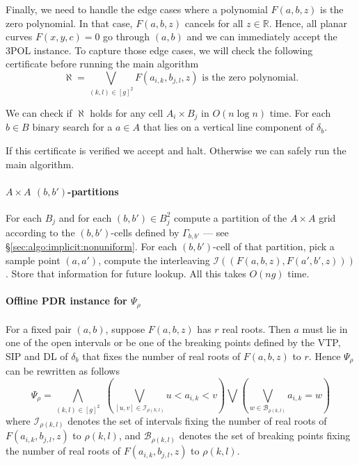Finally, we need to handle the edge cases where a polynomial $F(a,b,z)$ is the
zero polynomial. In that case, $F(a,b,z)$ cancels for all $z \in
\mathbb{R}$. Hence, all planar curves $F(x,y,c)=0$ go through $(a,b)$ and we
can immediately accept the 3POL instance. To capture
those edge cases, we will check the following certificate before running the main
algorithm
\begin{displaymath}
	\aleph = \bigvee_{(k,l)\in{{[g]}^2}} F(a_{i,k},b_{j,l},z)\,\,\text{is the zero polynomial}.
\end{displaymath}

We can check if $\aleph$ holds for any cell $A_i \times B_j$ in $O(n \log n)$ time.
For each $b \in B$ binary search for a $a \in A$ that lies on a vertical line
component of $\delta_b$.

If this certificate is verified we accept and halt. Otherwise we can safely run
the main algorithm.

\paragraph{$A \times A$ $(b,b')$-partitions}
For each $B_j$ and for each $(b,b') \in B_j^2$ compute a partition of the
$A \times A$ grid according to the $(b,b')$-cells defined by $\Gamma_{b,b'}$
--- see \S\ref{sec:algo:implicit:nonuniform}. For each $(b,b')$-cell of
that partition, pick a sample point $(a,a')$, compute the interleaving
$\mathcal{I}((F(a,b,z),F(a',b',z)))$. Store that information for future lookup.
All this takes $O(ng)$ time.

\paragraph{Offline PDR instance for $\Psi_\rho$}
For a fixed pair $(a,b)$, suppose $F(a,b,z)$ has $r$ real roots. Then $a$ must
lie in one of the open intervals or be one of the breaking points defined by
the VTP, SIP and DL of $\delta_b$ that fixes the number of real roots of
$F(a,b,z)$ to $r$.
Hence $\Psi_\rho$ can be rewritten as follows
\begin{displaymath}
	\Psi_{\rho} =
	\bigwedge_{(k,l)\in{[g]}^2}\,\,
	\left(\bigvee_{[u,v]\in \mathcal{I}_{\rho(k,l)}} u < a_{i,k} < v\right)
	\bigvee
	\left(\bigvee_{w\in \mathcal{B}_{\rho(k,l)}} a_{i,k} = w\right)
\end{displaymath}
where $\mathcal{I}_{\rho(k,l)}$ denotes the set of intervals fixing the number
of real roots of $F(a_{i,k},b_{j,l},z)$ to $\rho(k,l)$, and
$\mathcal{B}_{\rho(k,l)}$ denotes the set of breaking points fixing the number
of real roots of $F(a_{i,k},b_{j,l},z)$ to $\rho(k,l)$.

